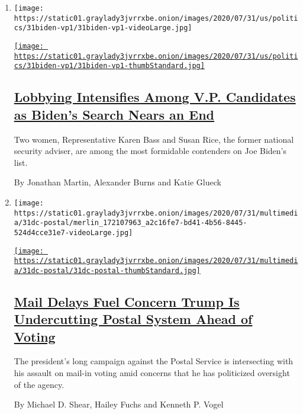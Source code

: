 \begin{enumerate}
\def\labelenumi{\arabic{enumi}.}
\item
  \texttt{[image: https://static01.graylady3jvrrxbe.onion/images/2020/07/31/us/politics/31biden-vp1/31biden-vp1-videoLarge.jpg]}

  \href{/2020/07/31/us/politics/joseph-biden-vice-president.html}{\texttt{[image: https://static01.graylady3jvrrxbe.onion/images/2020/07/31/us/politics/31biden-vp1/31biden-vp1-thumbStandard.jpg]}}

  \hypertarget{lobbying-intensifies-among-vp-candidates-as-bidens-search-nears-an-end}{%
  \subsection{\texorpdfstring{\href{/2020/07/31/us/politics/joseph-biden-vice-president.html}{Lobbying
  Intensifies Among V.P. Candidates as Biden's Search Nears an
  End}}{Lobbying Intensifies Among V.P. Candidates as Biden's Search Nears an End}}\label{lobbying-intensifies-among-vp-candidates-as-bidens-search-nears-an-end}}

  Two women, Representative Karen Bass and Susan Rice, the former
  national security adviser, are among the most formidable contenders on
  Joe Biden's list.

  By Jonathan Martin, Alexander Burns and Katie Glueck
\item
  \texttt{[image: https://static01.graylady3jvrrxbe.onion/images/2020/07/31/multimedia/31dc-postal/merlin\_172107963\_a2c16fe7-bd41-4b56-8445-524d4cce31e7-videoLarge.jpg]}

  \href{/2020/07/31/us/politics/trump-usps-mail-delays.html}{\texttt{[image: https://static01.graylady3jvrrxbe.onion/images/2020/07/31/multimedia/31dc-postal/31dc-postal-thumbStandard.jpg]}}

  \hypertarget{mail-delays-fuel-concern-trump-is-undercutting-postal-system-ahead-of-voting}{%
  \subsection{\texorpdfstring{\href{/2020/07/31/us/politics/trump-usps-mail-delays.html}{Mail
  Delays Fuel Concern Trump Is Undercutting Postal System Ahead of
  Voting}}{Mail Delays Fuel Concern Trump Is Undercutting Postal System Ahead of Voting}}\label{mail-delays-fuel-concern-trump-is-undercutting-postal-system-ahead-of-voting}}

  The president's long campaign against the Postal Service is
  intersecting with his assault on mail-in voting amid concerns that he
  has politicized oversight of the agency.

  By Michael D. Shear, Hailey Fuchs and Kenneth P. Vogel
\end{enumerate}

